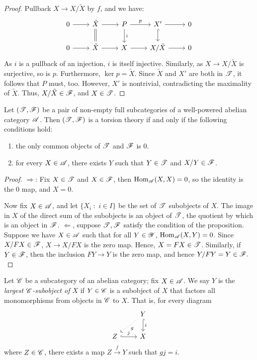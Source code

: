 \begin{proof}
Pullback $X \to X/\tilde{X}$ by $f$, and we have:
\[
\begin{tikzcd}
0 \arrow{r} &
\tilde{X} \arrow{r}\arrow[equals]{d} &
P \arrow{r}{p} \arrow{d}{i} &
X' \arrow{r} \arrow[hook]{d} &
0 \\
0 \arrow{r} &
\tilde{X} \arrow{r} &
X \arrow{r} &
X/\tilde{X} \arrow{r} &
0
\end{tikzcd}
\]
As $i$ is a pullback of an injection, $i$ is itself injective.
Similarly, as $X \to X/\tilde{X}$ is surjective, so is $p$.
Furthermore, $\ker p = \tilde{X}$. Since $\tilde{X}$ and $X'$
are both in $\mathscr{T}$, it follows that $P$ must, too. However,
$X'$ is nontrivial, contradicting the maximality of $\tilde{X}$.
Thus, $X/\tilde{X} \in \mathscr{F}$, and $X \in \mathscr{T}$.
\end{proof}

\begin{prop}
Let $(\mathscr{T}, \mathscr{F})$ be a pair of non-empty full subcategories
of a well-powered abelian category $\mathscr{A}$. Then $(\mathscr{T}, 
\mathscr{F})$ is a torsion theory if and only if the following 
conditions hold:
\begin{enumerate}
\item the only common objects of $\mathscr{T}$ and $\mathscr{F}$ is 0.

\item for every $X \in \mathscr{A}$, there exists $Y$ such that $Y \in 
\mathscr{T}$ and $X/Y \in \mathscr{F}$.
\end{enumerate}
\end{prop}
\begin{proof}
\noindent $\Rightarrow$: Fix $X \in \mathscr{T}$ and $X \in \mathscr{F}$, 
then $\mathrm{Hom}_{\mathscr{A}}(X,X) = 0$, so the identity is the 0 map, and
$X = 0$.

Now fix $X \in \mathscr{A}$, and let $\{X_i\;:\;i \in I\}$ be the set
of $\mathscr{T}$ subobjects of $X$. The image in $X$ of the direct 
sum of the subobjects is an object of $\mathscr{T}$, the quotient by 
which is an object in $\mathscr{F}$.
\vskip 10pt
\noindent $\Leftarrow$, suppose $\mathscr{T}, \mathscr{F}$ satisfy the 
condition of the proposition. Suppose we have $X \in \mathscr{A}$ such 
that for all $Y \in \mathscr{Y}$, $\mathrm{Hom}_{\mathscr{A}}(X, Y) = 0$.
Since $X/FX \in \mathscr{F}$, $X \to X/FX$ is the zero map. Hence, $X 
= FX \in \mathscr{T}$. Similarly, if $Y \in \mathscr{F}$, then the 
inclusion $FY \to Y$ is the zero map, and hence $Y/FY = Y \in 
\mathscr{F}.$
\end{proof}

\begin{defn}
Let $\mathscr{C}$ be a subcategory of an abelian category; fix $X \in
\mathscr{A}$. We say $Y$ is the \emph{largest $\mathscr{C}$-subobject of 
$X$} if $Y \in \mathscr{C}$ is a subobject of $X$ that factors all 
monomorphisms from objects in $\mathscr{C}$ to $X$. That is, for 
every diagram
\[
\begin{tikzcd}
{} &
Y \arrow[hook]{d}{i} \arrow[dotted]{ld}{g} \\
Z \arrow[hook]{r}{j} & X
\end{tikzcd}
\]
where $Z \in \mathscr{C}$, there exists a map $Z \stackrel{f}{\to} Y$ 
such that $gj = i$.
\end{defn}

